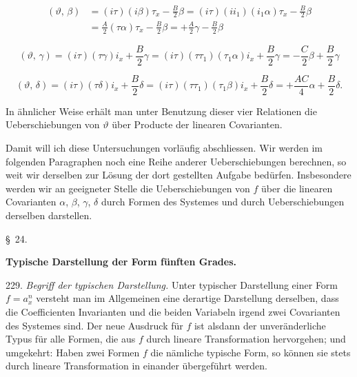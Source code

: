\documentclass[11pt]{article}
\providecommand{\weberpage}[1]{}
\providecommand{\weq}[2]{\begin{equation}\tag{#1}#2\end{equation}}
\begin{document}
\weq{2}{\begin{aligned}
(\vartheta,\,\beta) &= (i\tau)(i\beta)\tau_x - \frac{B}{2}\beta = (i\tau)(ii_1)(i_1\alpha)\tau_x - \frac{B}{2}\beta\\
&= \frac{A}{2}(\tau\alpha)\tau_x - \frac{B}{2}\beta = +\frac{A}{2}\gamma - \frac{B}{2}\beta
\end{aligned}}

\weq{3}{(\vartheta,\,\gamma) = (i\tau)(\tau\gamma)i_x + \frac{B}{2}\gamma = (i\tau)(\tau\tau_1)(\tau_1\alpha)i_x + \frac{B}{2}\gamma = -\frac{C}{2}\beta + \frac{B}{2}\gamma}

\weq{4}{(\vartheta,\,\delta) = (i\tau)(\tau\delta)i_x + \frac{B}{2}\delta = (i\tau)(\tau\tau_1)(\tau_1\beta)i_x + \frac{B}{2}\delta = +\frac{AC}{4}\alpha + \frac{B}{2}\delta.}


\weberpage{253}

In ähnlicher Weise erhält man unter Benutzung dieser vier Relationen
die Ueberschiebungen von $\vartheta$ über Producte der linearen Covarianten.

Damit will ich diese Untersuchungen vorläufig abschliessen. Wir
werden im folgenden Paragraphen noch eine Reihe anderer Ueberschiebungen
berechnen, so weit wir derselben zur Lösung der dort
gestellten Aufgabe bedürfen. Insbesondere werden wir an geeigneter
Stelle die Ueberschiebungen von $f$ über die linearen Covarianten $\alpha$, $\beta$,
$\gamma$, $\delta$ durch Formen des Systemes und durch Ueberschiebungen derselben
darstellen.

\begin{center}
\S~24.

\textbf{Typische Darstellung der Form fünften Grades.}
\end{center}

229. \textit{Begriff der typischen Darstellung.} Unter typischer Darstellung
einer Form $f = a_x^n$ versteht man im Allgemeinen eine derartige
Darstellung derselben, dass die Coefficienten Invarianten und
die beiden Variabeln irgend zwei Covarianten des Systemes sind. Der
neue Ausdruck für $f$ ist alsdann der unveränderliche Typus für alle
Formen, die aus $f$ durch lineare Transformation hervorgehen; und umgekehrt:
Haben zwei Formen $f$ die nämliche typische Form, so können
sie stets durch lineare Transformation in einander übergeführt werden.
\end{document}
